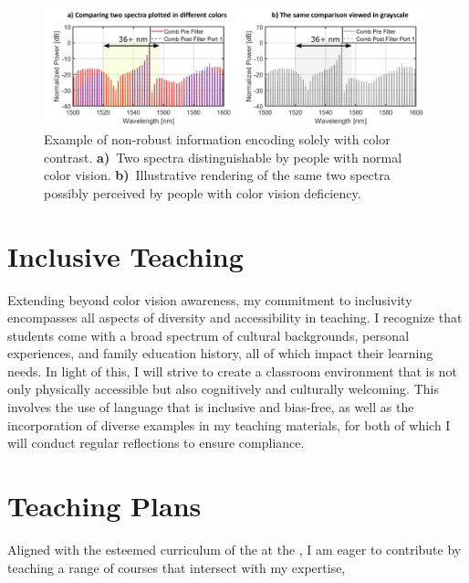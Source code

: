 \begin{figure}[!ht]%
    \centering
    \includegraphics[width=0.8\linewidth]{../../fig/color.pdf}
    \caption{Example of non-robust information encoding solely with color contrast. \textbf{a)}~Two spectra distinguishable by people with normal color vision. \textbf{b)}~Illustrative rendering of the same two spectra possibly perceived by people with color vision deficiency.}
    \label{fig:color}
\end{figure}

\section{Inclusive Teaching}
Extending beyond color vision awareness, my commitment to inclusivity encompasses all aspects of diversity and accessibility in teaching. I recognize that students come with a broad spectrum of cultural backgrounds, personal experiences, and family education history, all of which impact their learning needs. In light of this, I will strive to create a classroom environment that is not only physically accessible but also cognitively and culturally welcoming. This involves the use of language that is inclusive and bias-free, as well as the incorporation of diverse examples in my teaching materials, for both of which I will conduct regular reflections to ensure compliance.


\section{Teaching Plans}
Aligned with the esteemed curriculum of the \appDept{} at the \appSchool{}, I am eager to contribute by teaching a range of courses that intersect with my expertise,%